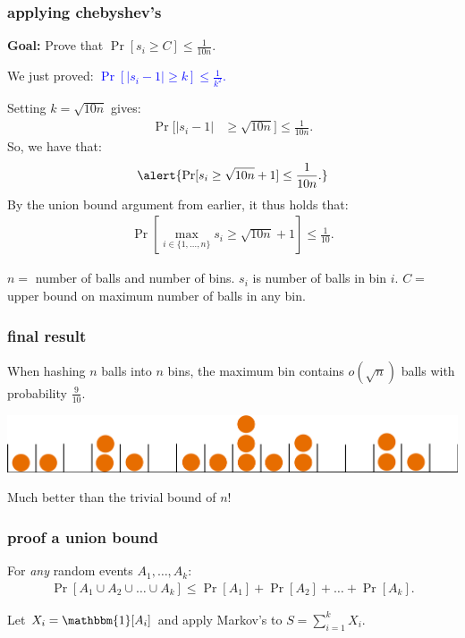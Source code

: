 \documentclass[compress]{beamer}
\newcommand{\blue}[1]{\textcolor{blue}{#1}}
\begin{document}
\begin{frame}
	\frametitle{applying chebyshev's}
	\textbf{Goal:} Prove that $\Pr[s_i \geq C] \leq \frac{1}{10n}$. 
	
	We just proved: \blue{$\Pr[\left|s_i - 1\right| \geq k] \leq \frac{1}{k^2}$.}
	
	Setting $k = \sqrt{10n}$ gives: 
	\begin{align*}
		\Pr[\left|s_i - 1\right| &\geq \sqrt{10n}] \leq \frac{1}{10 n}.
	\end{align*}
	So, we have that:
	\begin{align*}
		\alert{\Pr[s_i \geq \sqrt{10n} + 1] \leq \frac{1}{10n}.}
	\end{align*}
	By the union bound argument from earlier, it thus holds that:
	\begin{align*}
		\Pr[\max_{i\in \{1,\ldots, n\}}s_i \geq \sqrt{10n} + 1] \leq \frac{1}{10}.
	\end{align*}
	
	
	\vspace{1em}
	\begin{block}{\vspace*{-3ex}}
		\small $n = $ number of balls and number of bins. $s_i$ is number of balls in bin $i$. $C =$ upper bound on maximum number of balls in any bin.
	\end{block}
\end{frame}

\begin{frame}
	\frametitle{final result}
	
	\begin{center}
		When hashing $n$ balls into $n$ bins, the maximum bin contains $o(\sqrt{n})$ balls with probability $\frac{9}{10}$.
		
		\vspace{1em}
		\includegraphics[width=.8\textwidth]{balls_into_bins.png}
		\vspace{1em}
		
		Much better than the trivial bound of $n$! 
	\end{center}
\end{frame}

\begin{frame}[t]
	\frametitle{proof a union bound}
	\begin{lemma}
		For \emph{any} random events $A_1, \ldots, A_k$:
		\begin{align*}
			\Pr[A_1 \cup A_2 \cup \ldots \cup A_k] \leq \Pr[A_1] + \Pr[A_2] + \ldots +\Pr[A_k].
		\end{align*}
	\end{lemma}

		Let $X_i =  \mathbbm{1}[A_i]$ and apply Markov's to $S = \sum_{i=1}^k X_i$. 
	
\end{frame}
\end{document}
